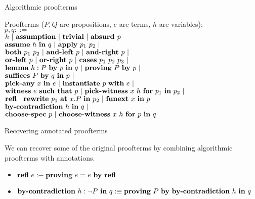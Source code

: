 \begin{frame}{Algorithmic proofterms}

Proofterms ($P, Q$ are propositions, $e$ are terms, $h$ are variables): \\
$p, q ::=$ \\
\qquad $h \pipe \assumption \pipe \trueintro \pipe \falseelim{p}$ \\
\qquad $\implintro{h}{q} \pipe \implelim{p_1}{p_2} \pipe$ \\
\qquad $\textbf{both}\ p_1\ p_2 \ |\  \textbf{and-left}\ p \ |\  \textbf{and-right}\ p \ |\ $ \\
\qquad $\textbf{or-left}\ p \ |\  \textbf{or-right}\ p \ |\  \textbf{cases}\ p_1\ p_2\ p_3 \ |\ $ \\
\qquad $\textbf{lemma}\ h : P\ \textbf{by}\ p\ \textbf{in}\ q \ |\  \textbf{proving}\ P\ \textbf{by}\ p \ |\ $ \\
\qquad $\textbf{suffices}\ P\ \textbf{by}\ q\ \textbf{in}\ p \ |\ $ \\
\qquad $\allintro{x}{e} \pipe \allelim{p}{e} \pipe$ \\
\qquad $\textbf{witness}\ e\ \textbf{such that}\ p \ |\  \textbf{pick-witness}\ x\ h\ \textbf{for}\ p_1\ \textbf{in}\ p_2 \ |\ $ \\
\qquad $\refl \pipe \rewrite{p_1}[x.P]{p_2} \pipe \funext{x}{p}$ \\
\qquad $\bycontradiction{h}{q} \pipe$ \\
\qquad $\textbf{choose-spec}\ p \ |\  \textbf{choose-witness}\ x\ h\ \textbf{for}\ p\ \textbf{in}\ q$

\end{frame}

\begin{frame}{Recovering annotated proofterms}

We can recover some of the original proofterms by combining algorithmic proofterms with annotations.

\begin{itemize}
  \item $\refl[e] :\equiv \proving{\Eq{e}{e}}{\refl}$
  \item $\bycontradiction{h}[P]{q} :\equiv \proving{P}{\bycontradiction{h}{q}}$
\end{itemize}

\vspace{2em}

\end{frame}